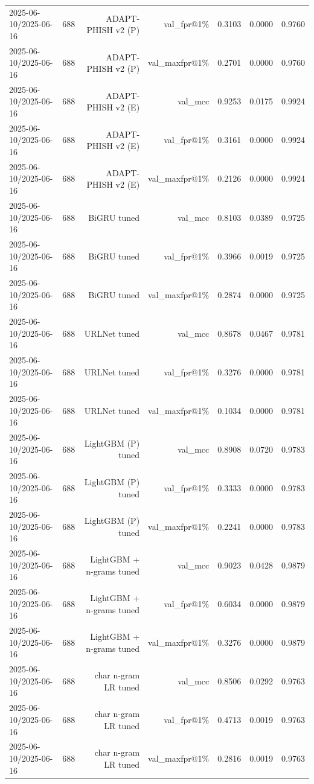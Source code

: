 \begin{table}[t]
\begin{tabular}{llrrrrr}
2025-06-10/2025-06-16 & 688 & ADAPT-PHISH v2 (P) & val\_fpr@1\% & 0.3103 & 0.0000 & 0.9760 \\
2025-06-10/2025-06-16 & 688 & ADAPT-PHISH v2 (P) & val\_maxfpr@1\% & 0.2701 & 0.0000 & 0.9760 \\
2025-06-10/2025-06-16 & 688 & ADAPT-PHISH v2 (E) & val\_mcc & 0.9253 & 0.0175 & 0.9924 \\
2025-06-10/2025-06-16 & 688 & ADAPT-PHISH v2 (E) & val\_fpr@1\% & 0.3161 & 0.0000 & 0.9924 \\
2025-06-10/2025-06-16 & 688 & ADAPT-PHISH v2 (E) & val\_maxfpr@1\% & 0.2126 & 0.0000 & 0.9924 \\
2025-06-10/2025-06-16 & 688 & BiGRU tuned & val\_mcc & 0.8103 & 0.0389 & 0.9725 \\
2025-06-10/2025-06-16 & 688 & BiGRU tuned & val\_fpr@1\% & 0.3966 & 0.0019 & 0.9725 \\
2025-06-10/2025-06-16 & 688 & BiGRU tuned & val\_maxfpr@1\% & 0.2874 & 0.0000 & 0.9725 \\
2025-06-10/2025-06-16 & 688 & URLNet tuned & val\_mcc & 0.8678 & 0.0467 & 0.9781 \\
2025-06-10/2025-06-16 & 688 & URLNet tuned & val\_fpr@1\% & 0.3276 & 0.0000 & 0.9781 \\
2025-06-10/2025-06-16 & 688 & URLNet tuned & val\_maxfpr@1\% & 0.1034 & 0.0000 & 0.9781 \\
2025-06-10/2025-06-16 & 688 & LightGBM (P) tuned & val\_mcc & 0.8908 & 0.0720 & 0.9783 \\
2025-06-10/2025-06-16 & 688 & LightGBM (P) tuned & val\_fpr@1\% & 0.3333 & 0.0000 & 0.9783 \\
2025-06-10/2025-06-16 & 688 & LightGBM (P) tuned & val\_maxfpr@1\% & 0.2241 & 0.0000 & 0.9783 \\
2025-06-10/2025-06-16 & 688 & LightGBM + n-grams tuned & val\_mcc & 0.9023 & 0.0428 & 0.9879 \\
2025-06-10/2025-06-16 & 688 & LightGBM + n-grams tuned & val\_fpr@1\% & 0.6034 & 0.0000 & 0.9879 \\
2025-06-10/2025-06-16 & 688 & LightGBM + n-grams tuned & val\_maxfpr@1\% & 0.3276 & 0.0000 & 0.9879 \\
2025-06-10/2025-06-16 & 688 & char n-gram LR tuned & val\_mcc & 0.8506 & 0.0292 & 0.9763 \\
2025-06-10/2025-06-16 & 688 & char n-gram LR tuned & val\_fpr@1\% & 0.4713 & 0.0019 & 0.9763 \\
2025-06-10/2025-06-16 & 688 & char n-gram LR tuned & val\_maxfpr@1\% & 0.2816 & 0.0019 & 0.9763 \\

\end{tabular}
\end{table}
